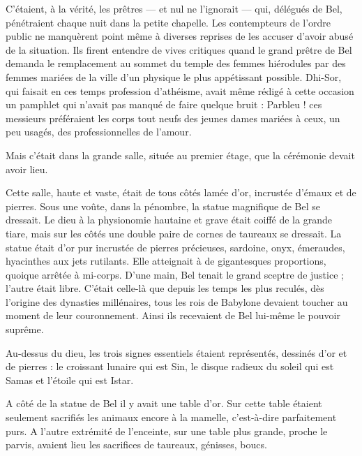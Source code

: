 \documentclass[a4paper, 11pt, oneside, polutonikogreek, french]{article}
\begin{document}
C'étaient, à la vérité, les prêtres --- et nul ne l'ignorait --- qui, délégués de Bel, pénétraient chaque nuit dans la petite chapelle. Les contempteurs de l'ordre public ne manquèrent point même à diverses reprises de les accuser d'avoir abusé de la situation. Ils firent entendre de vives critiques quand le grand prêtre de Bel demanda le remplacement au sommet du temple des femmes hiérodules par des femmes mariées de la ville d'un physique le plus appétissant possible. Dhi-Sor, qui faisait en ces temps profession d'athéisme, avait même rédigé à cette occasion un pamphlet qui n'avait pas manqué de faire quelque bruit : Parbleu ! ces messieurs préféraient les corps tout neufs des jeunes dames mariées à ceux, un peu usagés, des professionnelles de l'amour.

\bigskip
\centerline{\EightStarTaper}
\centerline{\EightStarTaper\EightStarTaper}
\bigskip

Mais c'était dans la grande salle, située au premier étage, que la cérémonie devait avoir lieu.

Cette salle, haute et vaste, était de tous côtés lamée d'or, incrustée d'émaux et de pierres. Sous une voûte, dans la pénombre, la statue magnifique de Bel se dressait. Le dieu à la physionomie hautaine et grave était coiffé de la grande tiare, mais sur les côtés une double paire de cornes de taureaux se dressait. La statue était d'or pur incrustée de pierres précieuses, sardoine, onyx, émeraudes, hyacinthes aux jets rutilants. Elle atteignait à de gigantesques proportions, quoique arrêtée à mi-corps. D'une main, Bel tenait le grand sceptre de justice ; l'autre était libre. C'était celle-là que depuis les temps les plus reculés, dès l'origine des dynasties millénaires, tous les rois de Babylone devaient toucher au moment de leur couronnement. Ainsi ils recevaient de Bel lui-même le pouvoir suprême.

\bigskip
\centerline{\EightStarTaper}
\centerline{\EightStarTaper\EightStarTaper}
\bigskip

Au-dessus du dieu, les trois signes essentiels étaient représentés, dessinés d'or et de pierres : le croissant lunaire qui est Sin, le disque radieux du soleil qui est Samas et l'étoile qui est Istar.

A côté de la statue de Bel il y avait une table d'or. Sur cette table étaient seulement sacrifiés les animaux encore à la mamelle, c'est-à-dire parfaitement purs. A l'autre extrémité de l'enceinte, sur une table plus grande, proche le parvis, avaient lieu les sacrifices de taureaux, génisses, boucs.
\end{document}
